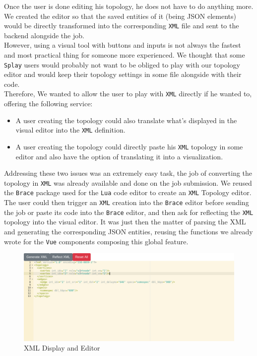 \documentclass{eplmastersthesis}
\begin{document}
        Once the user is done editing his topology, he does not have to
        do anything more. We created the editor so that the saved entities
        of it (being JSON elements) would be directly transformed into the
        corresponding \texttt{XML} file and sent to the backend alongside the
        job.\\

        However, using a visual tool with buttons and inputs is not always
        the fastest and most practical thing for someone more experienced. We
        thought that some \texttt{Splay} users would probably not want to be obliged
        to play with our topology editor and would keep their topology
        settings in some file alongside with their code.\\
        Therefore, We wanted to allow the user to play with \texttt{XML} directly
        if he wanted to, offering the following service:

        \begin{itemize}
          \item A user creating the topology could also translate what's
          displayed in the visual editor into the \texttt{XML} definition.
          \item A user creating the topology could directly paste
          his \texttt{XML} topology in some editor and also have the option of
          translating it into a visualization.
        \end{itemize}

        Addressing these two issues was an extremely easy task, the job of
        converting the topology in \texttt{XML} was already available and done on
        the job submission. We reused the \texttt{Brace} package used
        for the \texttt{Lua} code editor to create an \texttt{XML} Topology editor.\\
        The user could then trigger an \texttt{XML} creation into the \texttt{Brace} editor
        before sending the job or paste its code into the \texttt{Brace} editor, and
        then ask for reflecting the \texttt{XML} topology into the visual editor. It
        was just then the matter of parsing the XML and generating the
        corresponding JSON entities, reusing the functions we already wrote
        for the \texttt{Vue} components composing this global feature.

        \begin{figure}[H]
          \centering
          \includegraphics[scale=0.5]{figures/xml_topology.png}
          \caption{\label{xml_topology} XML Display and Editor}
        \end{figure}
\end{document}
